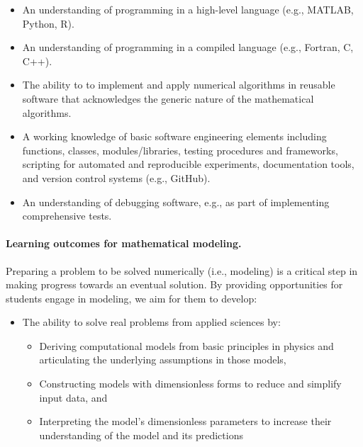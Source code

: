 \documentclass[%
oneside,                 %
final,                   %
10pt]{article}
\begin{document}
\begin{itemize}
\item An understanding of programming in a high-level language (e.g., MATLAB, Python, R).

\item An understanding of programming in a compiled language (e.g., Fortran, C, C++).

\item The ability to to implement and apply numerical algorithms in reusable software that acknowledges the generic nature of the mathematical algorithms.

\item A working knowledge of basic software engineering elements including functions, classes, modules/libraries, testing procedures and frameworks, scripting for automated and reproducible experiments, documentation tools, and version control systems (e.g., GitHub).

\item An understanding of debugging software, e.g., as part of implementing comprehensive tests.
\end{itemize}

\noindent
\paragraph{Learning outcomes for mathematical modeling.}
Preparing a problem to be solved numerically (i.e., modeling) is a critical step in making progress towards an eventual solution. By providing opportunities for students engage in modeling, we aim for them to develop:

\begin{itemize}
\item The ability to solve real problems from applied sciences by:
\begin{itemize}

  \item Deriving computational models from basic principles in physics and articulating the underlying assumptions in those models,

  \item Constructing models with dimensionless forms to reduce and simplify input data, and

  \item Interpreting the model's dimensionless parameters to increase their understanding of the model and its predictions
\end{itemize}

\noindent
\end{itemize}
\end{document}
